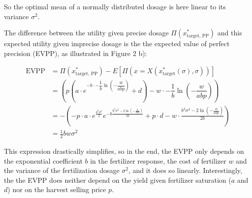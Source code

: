 So the optimal mean of a normally distributed dosage is here linear to its variance $\sigma^2$.

The difference between the utility given precise dosage $\Pi(x^\ast_\text{target, PP})$ and this expected utility given imprecise dosage is the the expected value of perfect precision (EVPP), as illustrated in Figure 2 b):

\begin{align}
\text{EVPP} &= \Pi(x^\ast_\text{target, PP}) - E[\Pi(x=X(x^\ast_\text{target}(\sigma), \sigma))]\\
&= \left(p  (a \cdot e^{-b \cdot -\dfrac{1}{b} \ln\left(-\dfrac{w}{abp}\right)} + d) - w \cdot -\dfrac{1}{b} \ln\left(-\dfrac{w}{abp}\right)\right)\\
&= - \left(- p \cdot a \cdot e^{\frac{b^2 \sigma^2}{2}} e^{-b \frac{b^2 \sigma^2 - 2 \ln\left(-\frac{w}{a b p}\right)}{2 b}} + p \cdot d - w \cdot \frac{b^2 \sigma^2 - 2 \ln\left(-\frac{w}{a b p}\right)}{2 b}\right)\\
&= \frac{1}{2} b w \sigma^{2}
\end{align}

This expression drastically simplifies, so in the end, the EVPP only depends on the exponential coefficient $b$ in the fertilizer response, the cost of fertilizer $w$ and the variance of the fertilization dosage $\sigma^2$, and it does so linearly. Interestingly, the the EVPP does neither depend on the yield given fertilizer saturation ($a$ and $d$) nor on the harvest selling price $p$.